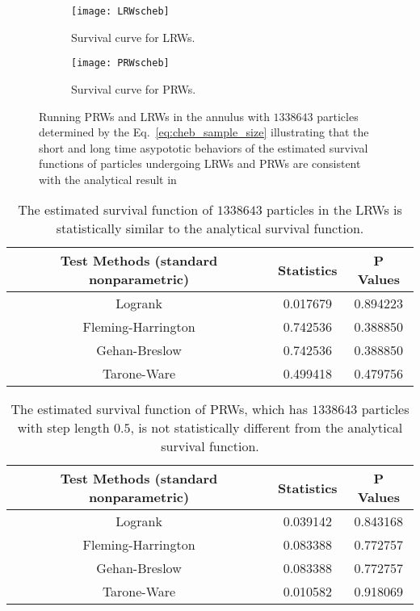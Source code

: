 \begin{figure}
  \begin{subfigure}{0.9\textwidth}
    \centering
    \texttt{[image: LRWscheb]}
    \caption{Survival curve for LRWs.\label{fig:LRW_survival}}
  \end{subfigure}
  \begin{subfigure}{0.9\textwidth}
    \centering
    \texttt{[image: PRWscheb]}
    \caption{Survival curve for PRWs.\label{fig:PRW_survival}}
  \end{subfigure}
  \caption{Running PRWs and LRWs in the annulus with $1338643$
    particles determined by the Eq.~\ref{eq:cheb_sample_size} illustrating
    that the short and long time asypototic behaviors of the estimated
    survival functions of particles undergoing LRWs and PRWs are
    consistent with the analytical result in }
  \label{fig:convergence_test}
\end{figure}

\begin{table}
  \centering
  \begin{tabular}{|c|c|c|}\hline
    Test Methods (standard nonparametric) & Statistics & P Values \\
    \hline
    Logrank & 0.017679 & 0.894223 \\
    \hline
    Fleming-Harrington & 0.742536 & 0.388850 \\
    \hline
    Gehan-Breslow & 0.742536 & 0.388850 \\
    \hline
    Tarone-Ware & 0.499418 & 0.479756 \\
    \hline
  \end{tabular}
  \caption{The estimated survival function of $1338643$ particles in
    the LRWs is statistically similar to the analytical survival
    function.}
  \label{tab:two_sample_test_lrws_analytical}
\end{table}

\begin{table}
  \centering
  \begin{tabular}{|c|c|c|}\hline
    Test Methods (standard nonparametric) & Statistics & P Values \\
    \hline
    Logrank & 0.039142 & 0.843168 \\
    \hline
    Fleming-Harrington & 0.083388 & 0.772757 \\
    \hline
    Gehan-Breslow & 0.083388 & 0.772757 \\
    \hline
    Tarone-Ware & 0.010582 & 0.918069 \\
    \hline
  \end{tabular}
  \caption{The estimated survival function of PRWs, which has
    $1338643$ particles with step length $0.5$, is not statistically
    different from the analytical survival function.}
  \label{tab:two_sample_test_prws_analytical}
\end{table}

